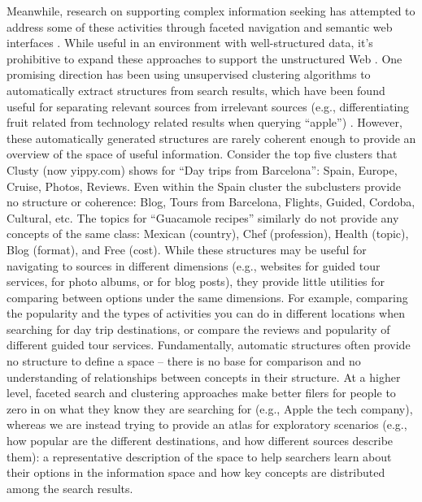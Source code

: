 Meanwhile, research on supporting complex information seeking has attempted to address some of these activities through faceted navigation \cite{hearst2006design} and semantic web interfaces \cite{wilson2006mspace}. While useful in an environment with well-structured data, it's prohibitive to expand these approaches to support the unstructured Web \cite{bruce1999workplace,teevan2008challenges}.
One promising direction has been using unsupervised clustering algorithms to automatically extract structures from search results, which have been found useful for separating relevant sources from irrelevant sources (e.g., differentiating fruit related from technology related results when querying ``apple'') \cite{zeng2004learning}. However, these automatically generated structures are rarely coherent enough to provide an overview of the space of useful information. Consider the top five clusters that Clusty (now yippy.com) shows for ``Day trips from Barcelona'': Spain, Europe, Cruise, Photos, Reviews. Even within the Spain cluster the subclusters provide no structure or coherence: Blog, Tours from Barcelona, Flights, Guided, Cordoba, Cultural, etc.  The topics for ``Guacamole recipes'' similarly do not provide any concepts of the same class: Mexican (country), Chef (profession), Health (topic), Blog (format), and Free (cost). While these structures may be useful for navigating to sources in different dimensions (e.g., websites for guided tour services, for photo albums, or for blog posts), they provide little utilities for comparing between options under the same dimensions. For example, comparing the popularity and the types of activities you can do in different locations when searching for day trip destinations, or compare the reviews and popularity of different guided tour services. Fundamentally, automatic structures often provide no structure to define a space -- there is no base for comparison and no understanding of relationships between concepts in their structure. 
At a higher level, faceted search and clustering approaches make better filers for people to zero in on what they know they are searching for (e.g., Apple the tech company), whereas we are instead trying to provide an atlas for exploratory scenarios (e.g., how popular are the different destinations, and how different sources describe them): a representative description of the space to help searchers learn about their options in the information space and how key concepts are distributed among the search results.

